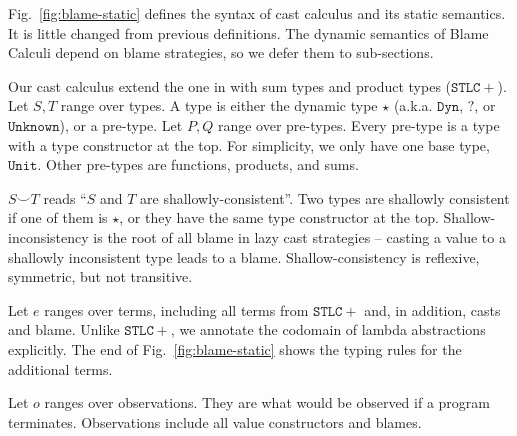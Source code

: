 \documentclass[acmsmall,review,anonymous]{acmart}\settopmatter{printfolios=true,printccs=false,printacmref=false}
\newcommand{\figref}[1]{Fig.~\ref{#1}}
\newcommand{\POOunit}[0]{\mathtt{Unit}}
\begin{document}
\figref{fig:blame-static} defines the syntax of cast calculus and its
static semantics. It is little changed from previous definitions.
  The dynamic semantics of Blame Calculi
depend on blame strategies, so we defer them to sub-sections.

Our cast calculus extend the one in \citet{siek2009exploring} with sum types 
and product types ($ \mathtt{STLC+} $). 
Let $ S,T $ range over types. A type is either the dynamic type $ \star $
(a.k.a. $ \mathtt{Dyn} $, $ \mathbb{?} $, or $ \mathtt{Unknown} $), 
or a pre-type. 
Let $ P,Q $ range over pre-types. Every pre-type is a type with a type 
constructor at the top. For simplicity, we only have one base type, $ \POOunit 
$. 
Other pre-types are functions, products, and sums.


$ S \smile T $ reads ``$ S $ and $ T $ are shallowly-consistent''. Two types 
are shallowly consistent if one of them is $ \star $, or they have the same 
type constructor at the top. Shallow-inconsistency is the root of all blame in 
lazy cast strategies -- casting a value to a shallowly inconsistent type leads 
to a blame. Shallow-consistency is reflexive, symmetric, but 
not transitive.

Let $ e $ ranges over terms, including all terms from $ \mathtt{STLC+} $ and, 
in addition, casts and blame. Unlike $ \mathtt{STLC+} $, we annotate the 
codomain of lambda abstractions explicitly.
The end of \figref{fig:blame-static} shows the typing rules for the
additional terms.

Let $ o $ ranges over observations. They are what would be observed if a 
program terminates. Observations include all value constructors and blames.
\end{document}
